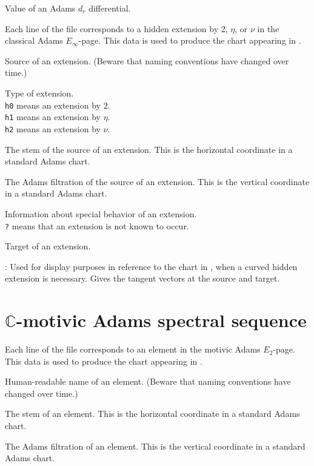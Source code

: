 \documentclass{amsart}
\newcommand{\C}         {\mathbb{C}}
\begin{document}
Value of an Adams $d_r$ differential.

\newpage


Each line of the file corresponds to a hidden extension by
$2$, $\eta$, or $\nu$ in the
classical Adams $E_\infty$-page.  This data is used to produce the
chart appearing in \cite{IWX19c}.

  Source of an extension.
(Beware that naming conventions have changed over time.)

 Type of extension. \\
\texttt{h0} means an extension by $2$. \\
\texttt{h1} means an extension by $\eta$. \\
\texttt{h2} means an extension by $\nu$.

 The stem of the source of an extension.  This is the
horizontal coordinate in a standard Adams chart.

 The Adams filtration of 
the source of an extension.  This is the vertical coordinate in a standard 
Adams chart.

 Information about special behavior of an extension. \\
\texttt{?} means that an extension is not known to occur.

 Target of an extension.

:
Used for display purposes in reference to the chart in \cite{IWX19c},
when a curved hidden extension is necessary.
Gives the tangent vectors at the source and target.

\newpage

\section{$\C$-motivic Adams spectral sequence}

Each line of the file corresponds to an element in the
motivic Adams $E_2$-page.  This data is used to produce the
chart appearing in \cite{IWX19c}.

  Human-readable name of an element.
(Beware that naming conventions have changed over time.)

 The stem of an element.  This is the
horizontal coordinate in a standard Adams chart.

 The Adams filtration of 
an element.  This is the vertical coordinate in a standard 
Adams chart.
\end{document}
